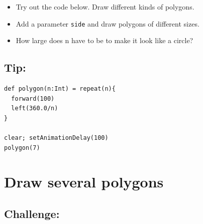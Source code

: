\begin{itemize}

\item {Try out the code below. Draw different kinds of polygons.}
\item {Add a parameter \lstinline{side} and draw polygons of different sizes.}
\item {How large does n have to be to make it look like a circle?}

\end{itemize}


\section*{\color{OliveGreen}Tip:}

\begin{lstlisting}[basicstyle={\ttfamily\fontsize{18}{22}\selectfont},numbers=none]
def polygon(n:Int) = repeat(n){
  forward(100)
  left(360.0/n)
}

clear; setAnimationDelay(100)
polygon(7)
\end{lstlisting}
        

  
\chapter{Draw several polygons}\section*{\color{BrickRed}Challenge:}


